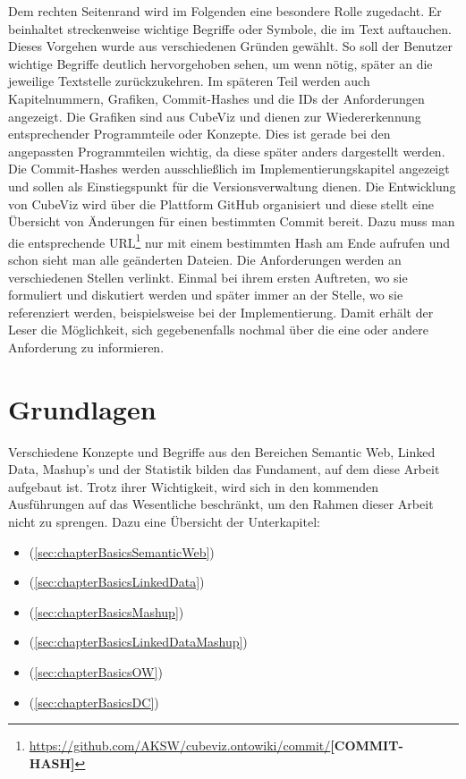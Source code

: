 \documentclass[11pt]{article}
\begin{document}
Dem rechten Seitenrand wird im Folgenden eine besondere Rolle zugedacht. Er beinhaltet streckenweise wichtige Begriffe oder Symbole, die im Text auftauchen. Dieses Vorgehen wurde aus verschiedenen Gründen gewählt. So soll der Benutzer wichtige Begriffe deutlich hervorgehoben sehen, um wenn nötig, später an die jeweilige Textstelle zurückzukehren. Im späteren Teil werden auch Kapitelnummern, Grafiken, Commit-Hashes und die IDs der Anforderungen angezeigt. Die Grafiken sind aus CubeViz und dienen zur Wiedererkennung entsprechender Programmteile oder Konzepte. Dies ist gerade bei den angepassten Programmteilen wichtig, da diese später anders dargestellt werden. Die Commit-Hashes werden ausschließlich im Implementierungskapitel angezeigt und sollen als Einstiegspunkt für die Versionsverwaltung dienen. Die Entwicklung von CubeViz wird über die Plattform GitHub organisiert und diese stellt eine Übersicht von Änderungen für einen bestimmten Commit bereit. Dazu muss man die entsprechende URL\footnote{\url{https://github.com/AKSW/cubeviz.ontowiki/commit/}\textbf{[COMMIT-HASH]}} nur mit einem bestimmten Hash am Ende aufrufen und schon sieht man alle geänderten Dateien. Die Anforderungen werden an verschiedenen Stellen verlinkt. Einmal bei ihrem ersten Auftreten, wo sie formuliert und diskutiert werden und später immer an der Stelle, wo sie referenziert werden, beispielsweise bei der Implementierung. Damit erhält der Leser die Möglichkeit, sich gegebenenfalls nochmal über die eine oder andere Anforderung zu informieren.


%

%
%
\newpage

\section{Grundlagen} 

Verschiedene Konzepte und Begriffe aus den Bereichen Semantic Web, Linked Data, Mashup's und der Statistik bilden das Fundament, auf dem diese Arbeit aufgebaut ist. Trotz ihrer Wichtigkeit, wird sich in den kommenden Ausführungen auf das Wesentliche beschränkt, um den Rahmen dieser Arbeit nicht zu sprengen. Dazu eine Übersicht der Unterkapitel:

\begin{itemize}
\setlength{\itemsep}{0mm}
    \item {} (\ref{sec:chapterBasicsSemanticWeb})
    \item {} (\ref{sec:chapterBasicsLinkedData})
    \item {} (\ref{sec:chapterBasicsMashup})
    \item {} (\ref{sec:chapterBasicsLinkedDataMashup})
    \item {} (\ref{sec:chapterBasicsOW})
    \item {} (\ref{sec:chapterBasicsDC})
\end{itemize}
\end{document}
